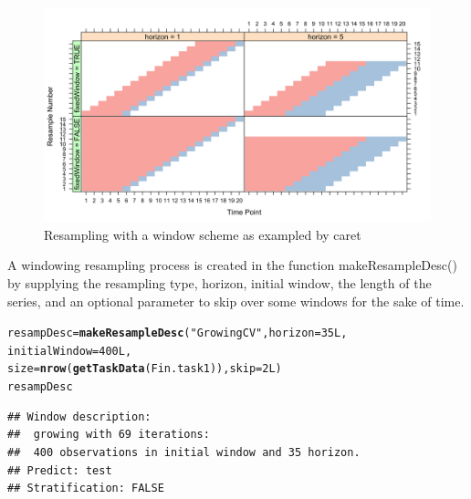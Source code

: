 \documentclass{article}\usepackage[]{graphicx}\usepackage[]{color}
\makeatletter
\newcommand{\hlnum}[1]{\textcolor[rgb]{0.686,0.059,0.569}{#1}}%
\newcommand{\hlstr}[1]{\textcolor[rgb]{0.192,0.494,0.8}{#1}}%
\newcommand{\hlstd}[1]{\textcolor[rgb]{0.345,0.345,0.345}{#1}}%
\newcommand{\hlkwb}[1]{\textcolor[rgb]{0.69,0.353,0.396}{#1}}%
\newcommand{\hlkwc}[1]{\textcolor[rgb]{0.333,0.667,0.333}{#1}}%
\newcommand{\hlkwd}[1]{\textcolor[rgb]{0.737,0.353,0.396}{\textbf{#1}}}%
\newenvironment{kframe}{%
 \def\at@end@of@kframe{}%
 \ifinner\ifhmode%
  \def\at@end@of@kframe{\end{minipage}}%
  \begin{minipage}{\columnwidth}%
 \fi\fi%
 \def\FrameCommand##1{\hskip\@totalleftmargin \hskip-\fboxsep
 \colorbox{shadecolor}{##1}\hskip-\fboxsep
     \hskip-\linewidth \hskip-\@totalleftmargin \hskip\columnwidth}%
 \MakeFramed {\advance\hsize-\width
   \@totalleftmargin\z@ \linewidth\hsize
   \@setminipage}}%
 {\par\unskip\endMakeFramed%
 \at@end@of@kframe}
\newenvironment{knitrout}{}{} %
\theoremstyle{definition}
\newcommand\code{\@codex}
\def\@codex#1{{\normalfont\ttfamily\hyphenchar\font=-1 #1}}
\makeatother
\begin{document}
\begin{figure}[ht]
\caption{Resampling with a window scheme as exampled by caret ~\cite{windowingcaret} }
  \includegraphics[scale = .2]{windowing_pic_caret}
  \centering
\end{figure}
\newpage

A windowing resampling process is created in the function \code{makeResampleDesc()} by supplying the resampling type, horizon, initial window, the length of the series, and an optional parameter to skip over some windows for the sake of time.

\begin{knitrout}
\color{fgcolor}\begin{kframe}
\begin{alltt}
\hlstd{resampDesc} \hlkwb{=} \hlkwd{makeResampleDesc}\hlstd{(}\hlstr{"GrowingCV"}\hlstd{,} \hlkwc{horizon} \hlstd{=} \hlnum{35L}\hlstd{,}
                               \hlkwc{initialWindow} \hlstd{=} \hlnum{400L}\hlstd{,}
                               \hlkwc{size} \hlstd{=} \hlkwd{nrow}\hlstd{(}\hlkwd{getTaskData}\hlstd{(Fin.task1)),} \hlkwc{skip} \hlstd{=} \hlnum{2L}\hlstd{)}
\hlstd{resampDesc}
\end{alltt}
\begin{verbatim}
## Window description:
##  growing with 69 iterations:
##  400 observations in initial window and 35 horizon.
## Predict: test
## Stratification: FALSE
\end{verbatim}
\end{kframe}
\end{knitrout}
\end{document}

